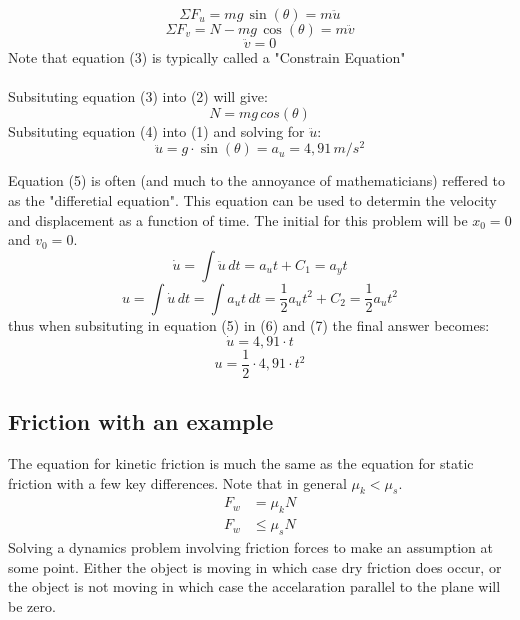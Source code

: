 \documentclass[11pt, a4paper]{article}
\begin{document}
\begin{equation}
    \Sigma F_u = mg \,\sin(\theta) = m\ddot{u}
\end{equation}
\begin{equation}
    \Sigma F_v = N - mg \, \cos(\theta) = m\ddot{v}
\end{equation}
\begin{equation}
    \ddot{v} = 0
\end{equation}
Note that equation (3) is typically called a "Constrain Equation"\\
\\
Subsituting equation (3) into (2) will give:
\begin{equation}
    N = m g \,cos(\theta)
\end{equation}
Subsituting equation (4) into (1) and solving for $\ddot{u}$:
\begin{equation}
    \ddot{u} = g \cdot \sin(\theta) = a_u = 4,91 \,m/s^2
\end{equation}

Equation (5) is often (and much to the annoyance of mathematicians) reffered to as the "differetial equation".
This equation can be used to determin the velocity and displacement as a function of time. The initial
for this problem will be $x_0 = 0$ and $v_0 = 0$.
\begin{equation}
    \dot{u} = \int \ddot{u} \,dt = a_u t + C_1 = a_y t
\end{equation}
\begin{equation}
    u = \int \dot{u} \,dt = \int a_u t \,dt = \frac{1}{2} a_u t^2 + C_2 = \frac{1}{2} a_u t^2
\end{equation}
thus when subsituting in equation (5) in (6) and (7) the final answer becomes:
\begin{equation*}
    \dot{u} = 4,91 \cdot t
\end{equation*}
\begin{equation*}
    u = \frac{1}{2} \cdot 4,91 \cdot t^2
\end{equation*}


\subsection{Friction with an example}
\setcounter{equation}{0}
The equation for kinetic friction is much the same as the equation
for static friction with a few key differences. Note that in general $\mu_k < \mu_s$.
\begin{align*}
    F_w &= \mu_k N \\
    F_w &\leq \mu_s N
\end{align*}
Solving a dynamics problem involving friction forces to make an assumption
at some point. Either the object is moving in which case dry friction does occur,
or the object is not moving in which case the accelaration parallel to the plane will be zero.
\end{document}
